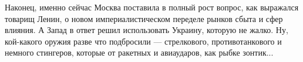 Наконец, именно сейчас Москва поставила в полный рост вопрос, как выражался
товарищ Ленин, о новом империалистическом переделе рынков сбыта и сфер влияния.
А Запад в ответ решил использовать Украину, которую не жалко. Ну, кой-какого
оружия разве что подбросили — стрелкового, противотанкового и немного
стингеров, которые от ракетных и авиаударов, как рыбке зонтик...

